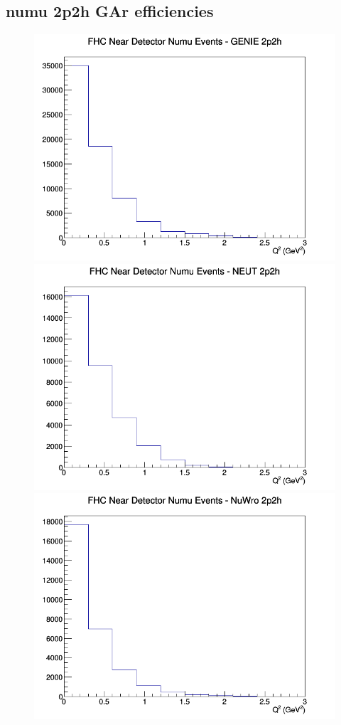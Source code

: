 \subsection{numu 2p2h GAr efficiencies}
\begin{figure}[h]
\includegraphics[width=\linewidth]{eff_Q2/GAr/2p2h_FHC_ND_numu_Q2_GENIE.png}
\endminipage
{}
\includegraphics[width=\linewidth]{eff_Q2/GAr/2p2h_FHC_ND_numu_Q2_NEUT.png}
\endminipage
{}
\includegraphics[width=\linewidth]{eff_Q2/GAr/2p2h_FHC_ND_numu_Q2_NuWro.png}

\end{figure}
